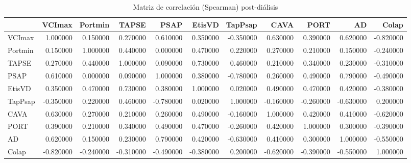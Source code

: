 \begin{table}
\caption{Matriz de correlación (Spearman) post-diálisis}
\label{tab:corr_pos}
\begin{tabular}{lrrrrrrrrrr}
\toprule
 & VCImax & Portmin & TAPSE & PSAP & EtisVD & TapPsap & CAVA & PORT & AD & Colap \\
\midrule
VCImax & 1.000000 & 0.150000 & 0.270000 & 0.610000 & 0.350000 & -0.350000 & 0.630000 & 0.390000 & 0.620000 & -0.820000 \\
Portmin & 0.150000 & 1.000000 & 0.440000 & 0.000000 & 0.470000 & 0.220000 & 0.270000 & 0.210000 & 0.150000 & -0.240000 \\
TAPSE & 0.270000 & 0.440000 & 1.000000 & 0.090000 & 0.730000 & 0.460000 & 0.210000 & 0.340000 & 0.230000 & -0.310000 \\
PSAP & 0.610000 & 0.000000 & 0.090000 & 1.000000 & 0.380000 & -0.780000 & 0.260000 & 0.490000 & 0.790000 & -0.490000 \\
EtisVD & 0.350000 & 0.470000 & 0.730000 & 0.380000 & 1.000000 & 0.020000 & 0.490000 & 0.470000 & 0.420000 & -0.380000 \\
TapPsap & -0.350000 & 0.220000 & 0.460000 & -0.780000 & 0.020000 & 1.000000 & -0.160000 & -0.260000 & -0.630000 & 0.200000 \\
CAVA & 0.630000 & 0.270000 & 0.210000 & 0.260000 & 0.490000 & -0.160000 & 1.000000 & 0.420000 & 0.410000 & -0.620000 \\
PORT & 0.390000 & 0.210000 & 0.340000 & 0.490000 & 0.470000 & -0.260000 & 0.420000 & 1.000000 & 0.300000 & -0.390000 \\
AD & 0.620000 & 0.150000 & 0.230000 & 0.790000 & 0.420000 & -0.630000 & 0.410000 & 0.300000 & 1.000000 & -0.550000 \\
Colap & -0.820000 & -0.240000 & -0.310000 & -0.490000 & -0.380000 & 0.200000 & -0.620000 & -0.390000 & -0.550000 & 1.000000 \\
\bottomrule
\end{tabular}
\end{table}
